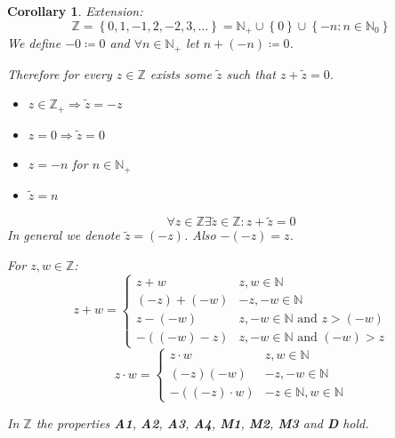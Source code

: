 \documentclass[a4paper,landscape,twocolumn]{article}
\newtheorem{cor}{Corollary}
\newcommand\set[1]{\left\{#1\right\}}
\begin{document}
\begin{cor}
  Extension:
  \[ \mathbb{Z} = \set{0, 1, -1, 2, -2, 3, \ldots} = \mathbb{N}_+ \cup \set{0} \cup \set{-n: n \in \mathbb N_0} \]
  We define $-0 \coloneqq 0$ and $\forall n \in \mathbb{N}_+$ let $n + (-n) \coloneqq 0$.

  Therefore for every $z \in \mathbb{Z}$ exists some $\tilde z$ such that $z + \tilde z = 0$.
  \begin{itemize}
    \item $z \in \mathbb{Z}_+ \Rightarrow \tilde z = -z$
    \item $z = 0 \Rightarrow \tilde z = 0$
    \item $z = -n$ for $n \in \mathbb{N}_+$
    \item $\tilde z = n$
  \end{itemize}
  \[ \forall z \in \mathbb{Z} \exists \tilde z \in \mathbb{Z}: z + \tilde z = 0 \]
  In general we denote $\tilde z = (-z)$.
  Also $-(-z) = z$.

  For $z,w \in \mathbb{Z}$:
  \[
    z + w =
    \begin{cases}
      z + w       & z,w \in \mathbb{N} \\
      (-z) + (-w) & -z, -w \in \mathbb{N} \\
      z - (-w)    & z, -w \in \mathbb{N} \text{ and } z > (-w) \\
      -((-w) - z) & z, -w \in \mathbb{N} \text{ and } (-w) > z
    \end{cases}
  \] \[
    z\cdot w =
    \begin{cases}
      z \cdot w       & z,w \in \mathbb{N} \\
      (-z)(-w)        & -z, -w \in \mathbb{N} \\
      -((-z) \cdot w) & -z \in \mathbb{N}, w \in \mathbb{N}
    \end{cases}
  \]

  In $\mathbb{Z}$ the properties \textbf{A1}, \textbf{A2}, \textbf{A3}, \textbf{A4},
  \textbf{M1}, \textbf{M2}, \textbf{M3} and \textbf{D} hold.
\end{cor}
\end{document}
